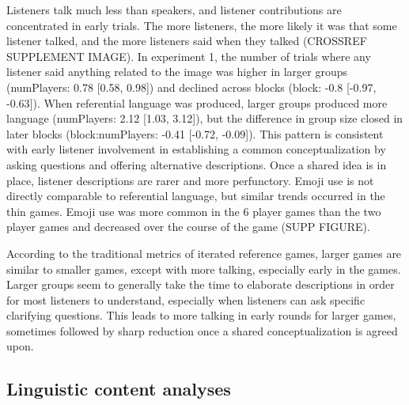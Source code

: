 \documentclass[
  english,
  a4paper,
]{article}
\begin{document}
Listeners talk much less than speakers, and listener contributions are concentrated in early trials. The more listeners, the more likely it was that some listener talked, and the more listeners said when they talked (CROSSREF SUPPLEMENT IMAGE). In experiment 1, the number of trials where any listener said anything related to the image was higher in larger groups (numPlayers: 0.78 {[}0.58, 0.98{]}) and declined across blocks (block: -0.8 {[}-0.97, -0.63{]}). When referential language was produced, larger groups produced more language (numPlayers: 2.12 {[}1.03, 3.12{]}), but the difference in group size closed in later blocks (block:numPlayers: -0.41 {[}-0.72, -0.09{]}). This pattern is consistent with early listener involvement in establishing a common conceptualization by asking questions and offering alternative descriptions. Once a shared idea is in place, listener descriptions are rarer and more perfunctory. Emoji use is not directly comparable to referential language, but similar trends occurred in the thin games. Emoji use was more common in the 6 player games than the two player games and decreased over the course of the game (SUPP FIGURE).

According to the traditional metrics of iterated reference games, larger games are similar to smaller games, except with more talking, especially early in the games. Larger groups seem to generally take the time to elaborate descriptions in order for most listeners to understand, especially when listeners can ask specific clarifying questions. This leads to more talking in early rounds for larger games, sometimes followed by sharp reduction once a shared conceptualization is agreed upon.

\hypertarget{linguistic-content-analyses}{%
\subsection{Linguistic content analyses}\label{linguistic-content-analyses}}
\end{document}
